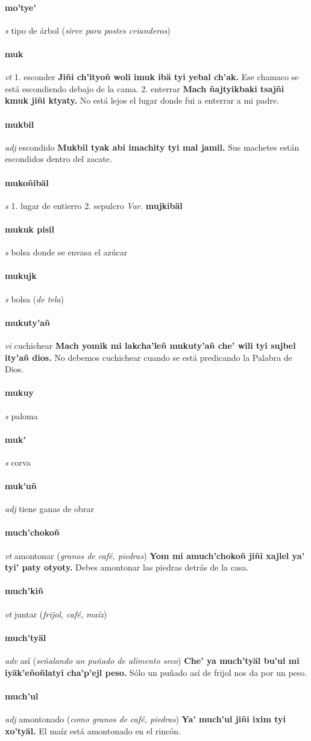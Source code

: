 \documentclass{scrbook}
\newcommand{\entry}[1]{\paragraph{#1}}
\newcommand{\onedefinition}[1]{#1.}
\newcommand{\partofspeech}[1]{\textit{#1}}
\newcommand{\spanishtranslation}[1]{#1}
\newcommand{\clarification}[1]{(\textit{#1})}
\newcommand{\cholexample}[1]{\textbf{#1}}
\newcommand{\exampletranslation}[1]{#1}
\newcommand{\variation}[1]{\textit{Var.} \textbf{#1}}
\begin{document}
\begin{multicols}{2}
\entry{mo'tye'}
\partofspeech{s}
\spanishtranslation{tipo de árbol}
\clarification{sirve para postes crianderos}

\entry{muk}
\partofspeech{vt}
\onedefinition{1}
\spanishtranslation{esconder}
\cholexample{Jiñi ch'ityoñ woli imuk ibä tyi yebal ch'ak.}
\exampletranslation{Ese chamaco se está escondiendo debajo de la cama.}
\onedefinition{2}
\spanishtranslation{enterrar}
\cholexample{Mach ñajtyikbaki tsajñi kmuk jiñi ktyaty.}
\exampletranslation{No está lejos el lugar donde fui a enterrar a mi padre.}

\entry{mukbil}
\partofspeech{adj}
\spanishtranslation{escondido}
\cholexample{Mukbil tyak abi imachity tyi mal jamil.}
\exampletranslation{Sus machetes están escondidos dentro del zacate.}

\entry{mukoñibäl}
\partofspeech{s}
\onedefinition{1}
\spanishtranslation{lugar de entierro}
\onedefinition{2}
\spanishtranslation{sepulcro}
\variation{mujkibäl}

\entry{mukuk pisil}
\partofspeech{s}
\spanishtranslation{bolsa donde se envasa el azúcar}

\entry{mukujk}
\partofspeech{s}
\spanishtranslation{bolsa}
\clarification{de tela}

\entry{mukuty'añ}
\partofspeech{vi}
\spanishtranslation{cuchichear}
\cholexample{Mach yomik mi lakcha'leñ mukuty'añ che' wili tyi sujbel ity'añ dios.}
\exampletranslation{No debemos cuchichear cuando se está predicando la Palabra de Dios.}

\entry{mukuy}
\partofspeech{s}
\spanishtranslation{paloma}

\entry{muk'}
\partofspeech{s}
\spanishtranslation{corva}

\entry{muk'uñ}
\partofspeech{adj}
\spanishtranslation{tiene ganas de obrar}

\entry{much'chokoñ}
\partofspeech{vt}
\spanishtranslation{amontonar}
\clarification{granos de café, piedras}
\cholexample{Yom mi amuch'chokoñ jiñi xajlel ya' tyi' paty otyoty.}
\exampletranslation{Debes amontonar las piedras detrás de la casa.}

\entry{much'kiñ}
\partofspeech{vt}
\spanishtranslation{juntar}
\clarification{frijol, café, maíz}

\entry{much'tyäl}
\partofspeech{adv}
\spanishtranslation{así}
\clarification{señalando un puñado de alimento seco}
\cholexample{Che' ya much'tyäl bu'ul mi iyäk'eñoñlatyi cha'p'ejl peso.}
\exampletranslation{Sólo un puñado así de frijol nos da por un peso.}

\entry{much'ul}
\partofspeech{adj}
\spanishtranslation{amontonado}
\clarification{como granos de café, piedras}
\cholexample{Ya' much'ul jiñi ixim tyi xo'tyäl.}
\exampletranslation{El maíz está amontonado en el rincón.}


\end{multicols}
\end{document}
